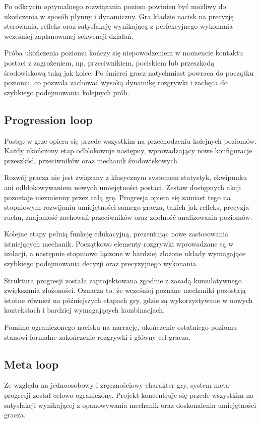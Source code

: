 \documentclass[11pt,a4paper]{article}
\begin{document}
Po odkryciu optymalnego rozwiązania poziom powinien być możliwy do ukończenia w sposób płynny i dynamiczny. Gra kładzie nacisk na precyzję sterowania, refleks oraz satysfakcję wynikającą z perfekcyjnego wykonania wcześniej zaplanowanej sekwencji działań.

Próba ukończenia poziomu kończy się niepowodzeniem w momencie kontaktu postaci z zagrożeniem, np. przeciwnikiem, pociskiem lub przeszkodą środowiskową taką jak kolce. Po śmierci gracz natychmiast powraca do początku poziomu, co pozwala zachować wysoką dynamikę rozgrywki i zachęca do szybkiego podejmowania kolejnych prób.

\subsection{Progression loop}

Postęp w grze opiera się przede wszystkim na przechodzeniu kolejnych poziomów. Każdy ukończony etap odblokowuje następny, wprowadzający nowe konfiguracje przeszkód, przeciwników oraz mechanik środowiskowych.

Rozwój gracza nie jest związany z klasycznym systemem statystyk, ekwipunku ani odblokowywaniem nowych umiejętności postaci. Zestaw dostępnych akcji pozostaje niezmienny przez całą grę. Progresja opiera się zamiast tego na stopniowym rozwijaniu umiejętności samego gracza, takich jak refleks, precyzja ruchu, znajomość zachowań przeciwników oraz zdolność analizowania poziomów.

Kolejne etapy pełnią funkcję edukacyjną, prezentując nowe zastosowania istniejących mechanik. Początkowo elementy rozgrywki wprowadzane są w izolacji, a następnie stopniowo łączone w bardziej złożone układy wymagające szybkiego podejmowania decyzji oraz precyzyjnego wykonania.

Struktura progresji została zaprojektowana zgodnie z zasadą kumulatywnego zwiększania złożoności. Oznacza to, że wcześniej poznane mechaniki pozostają istotne również na późniejszych etapach gry, gdzie są wykorzystywane w nowych kontekstach i bardziej wymagających kombinacjach.

Pomimo ograniczonego nacisku na narrację, ukończenie ostatniego poziomu stanowi formalne zakończenie rozgrywki i główny cel gracza.

\subsection{Meta loop}

Ze względu na jednoosobowy i zręcznościowy charakter gry, system meta--progresji został celowo ograniczony. Projekt koncentruje się przede wszystkim na satysfakcji wynikającej z opanowywania mechanik oraz doskonalenia umiejętności gracza.
\end{document}
